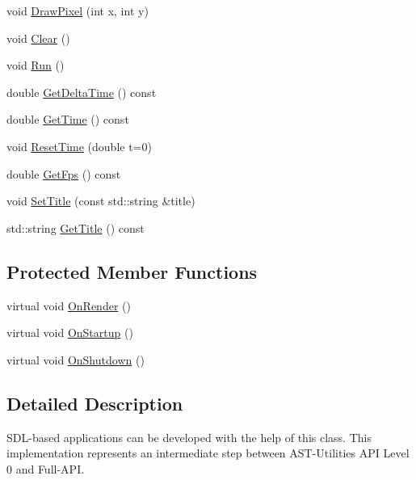 \begin{DoxyCompactItemize}
\item 
void \hyperlink{classastu_1_1Application_af26daac7b639690cd2682b2b33b77218}{Draw\+Pixel} (int x, int y)
\item 
void \hyperlink{classastu_1_1Application_ae9d3de234f6abde882816e9866bd07bc}{Clear} ()
\item 
void \hyperlink{classastu_1_1Application_a497dd50375ba6694479e0c57c8e32ffd}{Run} ()
\item 
double \hyperlink{classastu_1_1Application_a54815b8eb1210d2a4da6f3f439741a4d}{Get\+Delta\+Time} () const
\item 
double \hyperlink{classastu_1_1Application_afd91358b09a41d418bc1776befdb0fd7}{Get\+Time} () const
\item 
void \hyperlink{classastu_1_1Application_a823b362755043240ba83b785038720ac}{Reset\+Time} (double t=0)
\item 
double \hyperlink{classastu_1_1Application_a500d7e7a9c0100b8a4e1df2f80f85da9}{Get\+Fps} () const
\item 
void \hyperlink{classastu_1_1Application_aa5336d4fa0fff6231b4260888cb04440}{Set\+Title} (const std\+::string \&title)
\item 
std\+::string \hyperlink{classastu_1_1Application_a7456b7ba3af6c3d984d6f4e40b268426}{Get\+Title} () const
\end{DoxyCompactItemize}
\subsection*{Protected Member Functions}
\begin{DoxyCompactItemize}
\item 
virtual void \hyperlink{classastu_1_1Application_ae7eb0ef242caceca38890f78ddb85718}{On\+Render} ()
\item 
virtual void \hyperlink{classastu_1_1Application_a337064e8db0320f0ffe23ed98fc9fd85}{On\+Startup} ()
\item 
virtual void \hyperlink{classastu_1_1Application_a1894a6f4aca54dd7a4c063b614832f3e}{On\+Shutdown} ()
\end{DoxyCompactItemize}


\subsection{Detailed Description}
S\+D\+L-\/based applications can be developed with the help of this class. This implementation represents an intermediate step between A\+S\+T-\/\+Utilities A\+PI Level 0 and Full-\/\+A\+PI. 

